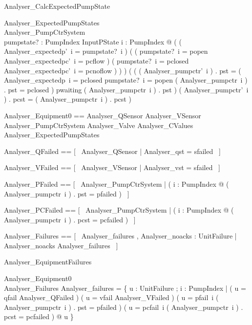 \documentclass{article}
\begin{document}
\begin{schema}{Analyser\_CalcExpectedPumpState}

 \Delta Analyser\_ExpectedPumpStates \\
 \Delta Analyser\_PumpCtrSystem \\
 pumpstate? : PumpIndex \fun InputPState 
\where
 \forall i : PumpIndex @ ( ( Analyser\_expectedp'~i = pumpstate?~i ) \land ( ( pumpstate?~i = popen \land Analyser\_expectedpc'~i = pcflow ) \lor ( pumpstate?~i = pclosed \land Analyser\_expectedpc'~i = pcnoflow ) ) ) \land ( ( ( Analyser\_pumpctr'~i ) . pst = \IF ( Analyser\_expectedp~i = pclosed \land pumpstate?~i = popen \land ( Analyser\_pumpctr~i ) . pst = pclosed ) \THEN pwaiting \ELSE ( Analyser\_pumpctr~i ) . pst ) \land ( Analyser\_pumpctr'~i ) . pcst = ( Analyser\_pumpctr~i ) . pcst )
\end{schema}

\begin{zed}
	Analyser\_Equipment0 == Analyser\_QSensor \land Analyser\_VSensor \land Analyser\_PumpCtrSystem \land Analyser\_Valve \land Analyser\_CValues \land Analyser\_ExpectedPumpStates
\end{zed}

\begin{zed}
	Analyser\_QFailed == [~  Analyser\_QSensor | Analyser\_qst = sfailed  ~]
\end{zed}

\begin{zed}
	Analyser\_VFailed == [~  Analyser\_VSensor | Analyser\_vst = sfailed  ~]
\end{zed}

\begin{zed}
	Analyser\_PFailed == [~  Analyser\_PumpCtrSystem | ( \exists i : PumpIndex @ ( Analyser\_pumpctr~i ) . pst = pfailed )  ~]
\end{zed}

\begin{zed}
	Analyser\_PCFailed == [~  Analyser\_PumpCtrSystem | ( \exists i : PumpIndex @ ( Analyser\_pumpctr~i ) . pcst = pcfailed )  ~]
\end{zed}

\begin{zed}
	Analyser\_Failures == [~  Analyser\_failures , Analyser\_noacks : \power UnitFailure | Analyser\_noacks \subseteq Analyser\_failures  ~]
\end{zed}

\begin{schema}{Analyser\_EquipmentFailures}

 Analyser\_Equipment0 \\
 Analyser\_Failures 
\where
 Analyser\_failures = \{ u : UnitFailure ; i : PumpIndex | ( u = qfail \land Analyser\_QFailed ) \lor ( u = vfail \land Analyser\_VFailed ) \lor ( u = pfail~i \land ( Analyser\_pumpctr~i ) . pst = pfailed ) \lor ( u = pcfail~i \land ( Analyser\_pumpctr~i ) . pcst = pcfailed ) @ u \}
\end{schema}
\end{document}

